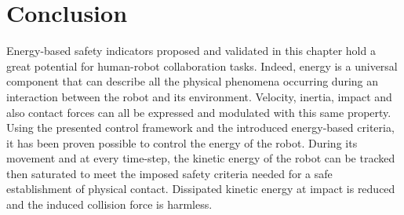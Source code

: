 \section{Conclusion}
\label{sec:safety1conclusion}
%
Energy-based safety indicators proposed and validated in this chapter hold a great potential for human-robot collaboration tasks. Indeed, energy is a universal component that can describe all the physical phenomena occurring during an interaction between the robot and its environment. Velocity, inertia, impact and also contact forces can all be expressed and modulated with this same property. Using the presented control framework and the introduced energy-based criteria, it has been proven possible to control the energy of the robot. During its movement and at every time-step, the kinetic energy of the robot can be tracked then saturated to meet the imposed safety criteria needed for a safe establishment of physical contact. Dissipated kinetic energy at impact is reduced and the induced collision force is harmless. \\
